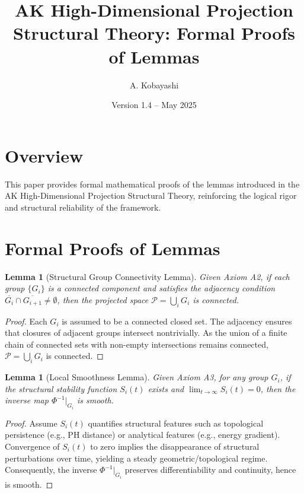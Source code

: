 \documentclass[11pt]{article}
\title{AK High-Dimensional Projection Structural Theory: Formal Proofs of Lemmas}
\author{A. Kobayashi}
\date{Version 1.4 -- May 2025}
\newtheorem{lemma}[definition]{Lemma}
\begin{document}
\maketitle

\section*{Overview}
This paper provides formal mathematical proofs of the lemmas introduced in the AK High-Dimensional Projection Structural Theory, reinforcing the logical rigor and structural reliability of the framework.

\section{Formal Proofs of Lemmas}

\begin{lemma}[Structural Group Connectivity Lemma]
Given Axiom A2, if each group \( \{G_i\} \) is a connected component and satisfies the adjacency condition \( \overline{G_i} \cap \overline{G_{i+1}} \neq \emptyset \), then the projected space \( \mathcal{P} = \bigcup_i G_i \) is connected.
\end{lemma}

\begin{proof}
Each \(G_i\) is assumed to be a connected closed set. The adjacency ensures that closures of adjacent groups intersect nontrivially. As the union of a finite chain of connected sets with non-empty intersections remains connected, \(\mathcal{P} = \bigcup_i G_i\) is connected.
\end{proof}

\begin{lemma}[Local Smoothness Lemma]
Given Axiom A3, for any group \(G_i\), if the structural stability function \(S_i(t)\) exists and \(\lim_{t \to \infty} S_i(t) = 0\), then the inverse map \(\Phi^{-1}|_{G_i}\) is smooth.
\end{lemma}

\begin{proof}
Assume \(S_i(t)\) quantifies structural features such as topological persistence (e.g., PH distance) or analytical features (e.g., energy gradient). Convergence of \(S_i(t)\) to zero implies the disappearance of structural perturbations over time, yielding a steady geometric/topological regime. Consequently, the inverse \(\Phi^{-1}|_{G_i}\) preserves differentiability and continuity, hence is smooth.
\end{proof}
\end{document}
